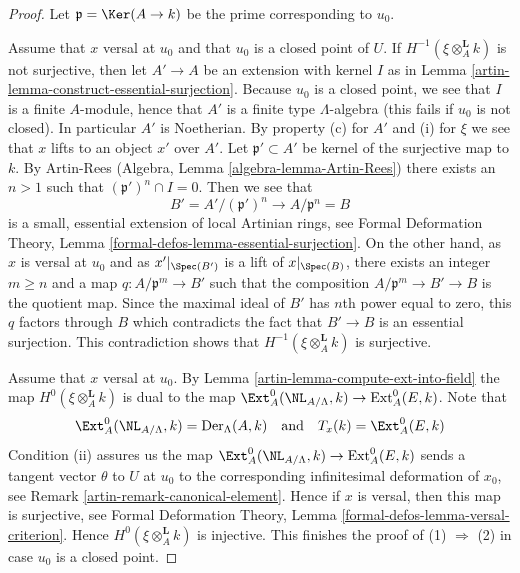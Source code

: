 \begin{proof}

Let $\mathfrak p = \Ker(A \to k)$ be the prime corresponding to $u_0$.

\medskip\noindent
Assume that $x$ versal at $u_0$ and that $u_0$ is a closed point of $U$.
If $H^{-1}(\xi \otimes_A^{\mathbf{L}} k)$ is not surjective, then
let $A' \to A$ be an extension with kernel $I$ as in
Lemma \ref{artin-lemma-construct-essential-surjection}.
Because $u_0$ is a closed point, we see that $I$ is a finite $A$-module,
hence that $A'$ is a finite type $\Lambda$-algebra (this fails if
$u_0$ is not closed). In particular $A'$ is Noetherian.
By property (c) for $A'$ and (i) for $\xi$ we see that $x$ lifts to
an object $x'$ over $A'$.
Let $\mathfrak p' \subset A'$ be kernel of the surjective map to $k$.
By Artin-Rees (Algebra, Lemma \ref{algebra-lemma-Artin-Rees})
there exists an $n > 1$ such that $(\mathfrak p')^n \cap I = 0$.
Then we see that
$$
B' = A'/(\mathfrak p')^n \longrightarrow A/\mathfrak p^n = B
$$
is a small, essential extension of local Artinian rings, see
Formal Deformation Theory, Lemma
\ref{formal-defos-lemma-essential-surjection}.
On the other hand, as $x$ is versal at $u_0$ and as $x'|_{\Spec(B')}$
is a lift of $x|_{\Spec(B)}$, there exists an integer
$m \geq n$ and a map $q : A/\mathfrak p^m \to B'$
such that the composition
$A/\mathfrak p^m \to B' \to B$ is the quotient map.
Since the maximal ideal of $B'$ has $n$th power equal to zero, this
$q$ factors through $B$ which contradicts the fact that $B' \to B$ is an
essential surjection. This contradiction shows that
$H^{-1}(\xi \otimes_A^{\mathbf{L}} k)$
is surjective.

\medskip\noindent
Assume that $x$ versal at $u_0$. By Lemma \ref{artin-lemma-compute-ext-into-field}
the map $H^0(\xi \otimes_A^{\mathbf{L}} k)$ is dual to the map
$\Ext^0_A(\NL_{A/\Lambda}, k) \to \text{Ext}^0_A(E, k)$. Note that
$$
\Ext^0_A(\NL_{A/\Lambda}, k) = \text{Der}_\Lambda(A, k)
\quad\text{and}\quad
T_x(k) = \Ext^0_A(E, k)
$$
Condition (ii) assures us the map
$\Ext^0_A(\NL_{A/\Lambda}, k) \to \text{Ext}^0_A(E, k)$
sends a tangent vector $\theta$ to $U$ at $u_0$ to the corresponding
infinitesimal deformation of $x_0$, see Remark \ref{artin-remark-canonical-element}.
Hence if $x$ is versal, then this map is surjective, see
Formal Deformation Theory, Lemma \ref{formal-defos-lemma-versal-criterion}.
Hence $H^0(\xi \otimes_A^{\mathbf{L}} k)$ is injective.
This finishes the proof of (1) $\Rightarrow$ (2) in case $u_0$ is a
closed point.


\end{proof}
